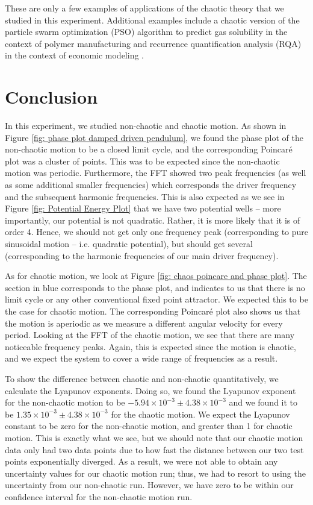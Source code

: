 \documentclass[twocolumn,amsmath,amssymb,pra, floatfix]{revtex4-2}
\begin{document}
These are only a few examples of applications of the chaotic theory that we studied in this experiment. Additional examples include a chaotic version of the particle swarm optimization (PSO) algorithm to predict gas solubility in the context of polymer manufacturing \cite{chemistry} and recurrence quantification analysis (RQA) in the context of economic modeling \cite{economics}. 

\section{Conclusion}
In this experiment, we studied non-chaotic and chaotic motion. As shown in Figure \ref{fig: phase plot damped driven pendulum}, we found the phase plot of the non-chaotic motion to be a closed limit cycle, and the corresponding Poincar\'{e} plot was a cluster of points. This was to be expected since the non-chaotic motion was periodic. Furthermore, the FFT showed two peak frequencies (as well as some additional smaller frequencies) which corresponds the driver frequency and the subsequent harmonic frequencies. This is also expected as we see in Figure \ref{fig: Potential Energy Plot} that we have two potential wells -- more importantly, our potential is not quadratic. Rather, it is more likely that it is of order 4. Hence, we should not get only one frequency peak (corresponding to pure sinusoidal motion -- i.e. quadratic potential), but should get several (corresponding to the harmonic frequencies of our main driver frequency).

As for chaotic motion, we look at Figure \ref{fig: chaos poincare and phase plot}. The section in blue corresponds to the phase plot, and indicates to us that there is no limit cycle or any other conventional fixed point attractor. We expected this to be the case for chaotic motion. The corresponding Poincar\'{e} plot also shows us that the motion is aperiodic as we measure a different angular velocity for every period. Looking at the FFT of the chaotic motion, we see that there are many noticeable frequency peaks. Again, this is expected since the motion is chaotic, and we expect the system to cover a wide range of frequencies as a result.

To show the difference between chaotic and non-chaotic quantitatively, we calculate the Lyapunov exponents. Doing so, we found the Lyapunov exponent for the non-chaotic motion to be $-5.94 \times 10^{-3} \pm 4.38 \times 10^{-3}$ and we found it to be $1.35 \times 10^{-3} \pm 4.38 \times 10^{-3}$ for the chaotic motion. We expect the Lyapunov constant to be zero for the non-chaotic motion, and greater than 1 for chaotic motion. This is exactly what we see, but we should note that our chaotic motion data only had two data points due to how fast the distance between our two test points exponentially diverged. As a result, we were not able to obtain any uncertainty values for our chaotic motion run; thus, we had to resort to using the uncertainty from our non-chaotic run. However, we have zero to be within our confidence interval for the non-chaotic motion run.
\end{document}
